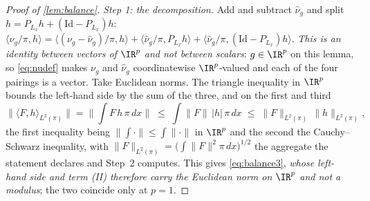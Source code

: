 \begin{proof}[Proof of \cref{lem:balance}]
\emph{Step 1: the decomposition.}
Add and subtract $\hat\nu_g$ and split $h=P_{L_x}h+(\mathrm{Id}-P_{L_x})h$:
$\langle\nu_g/\pi,h\rangle=\langle(\nu_g-\hat\nu_g)/\pi,h\rangle+\langle\hat\nu_g/\pi,P_{L_x}h\rangle+\langle\hat\nu_g/\pi,(\mathrm{Id}-P_{L_x})h\rangle$.
\emph{This is an identity between vectors of $\IR^{p}$ and not between scalars}: $g\in\IR^{p}$ on this
lemma, so \eqref{eq:nudef} makes $\nu_g$ and $\hat\nu_g$ coordinatewise $\IR^{p}$-valued and each of the
four pairings is a vector. Take Euclidean norms. The triangle inequality in $\IR^{p}$ bounds the
left-hand side by the sum of the three, and on the first and third
\[
\big\|\langle F,h\rangle_{L^{2}(\pi)}\big\|
=\Big\|\int F\,h\,\pi\,dx\Big\|
\;\le\;\int\|F\|\,|h|\,\pi\,dx
\;\le\;\|F\|_{L^{2}(\pi)}\,\|h\|_{L^{2}(\pi)} ,
\]
the first inequality being $\|\int\cdot\|\le\int\|\cdot\|$ in $\IR^{p}$ and the second the
Cauchy--Schwarz inequality, with $\|F\|_{L^{2}(\pi)}=\big(\int\|F\|^{2}\pi\,dx\big)^{1/2}$ the aggregate
the statement declares and Step~2 computes. This gives \eqref{eq:balance3}, \emph{whose left-hand side
and term \textup{(II)} therefore carry the Euclidean norm on $\IR^{p}$ and not a modulus}; the two
coincide only at $p=1$.


\end{proof}
